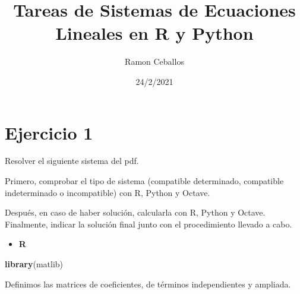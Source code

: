 \documentclass[
]{article}
\title{Tareas de Sistemas de Ecuaciones Lineales en R y Python}
\author{Ramon Ceballos}
\date{24/2/2021}
\newenvironment{Shaded}{\begin{snugshade}}{\end{snugshade}}
\newcommand{\KeywordTok}[1]{\textcolor[rgb]{0.13,0.29,0.53}{\textbf{#1}}}
\newcommand{\NormalTok}[1]{#1}
\providecommand{\tightlist}{%
  \setlength{\itemsep}{0pt}\setlength{\parskip}{0pt}}
\begin{document}
\maketitle

\hypertarget{ejercicio-1}{%
\section{Ejercicio 1}\label{ejercicio-1}}

Resolver el siguiente sistema del pdf.

Primero, comprobar el tipo de sistema (compatible determinado,
compatible indeterminado o incompatible) con R, Python y Octave.

Después, en caso de haber solución, calcularla con R, Python y Octave.
Finalmente, indicar la solución final junto con el procedimiento llevado
a cabo.

\begin{itemize}
\tightlist
\item
  \textbf{R}
\end{itemize}

\begin{Shaded}
\begin{Highlighting}[]
\KeywordTok{library}\NormalTok{(matlib)}
\end{Highlighting}
\end{Shaded}

Definimos las matrices de coeficientes, de términos independientes y
ampliada.
\end{document}

